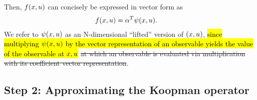 Then, $f(x, u)$  can concisely be expressed in vector form as
\begin{align}
    f(x, u) &= {\alpha}^T {\psi}(x, u).
    \label{eq:fxu}
\end{align}
We refer to ${\psi}(x, u)$ as an N-dimensional ``lifted''  version of ${(x, u)}$, \hl{since multiplying ${\psi}(x, u)$ by the vector representation of an observable yields the value of the observable at $x, u$} \sout{at which an observable is evaluated via multiplication with its coefficient vector representation}.



\subsection{Step 2: Approximating the Koopman operator} \label{sec:step2}

